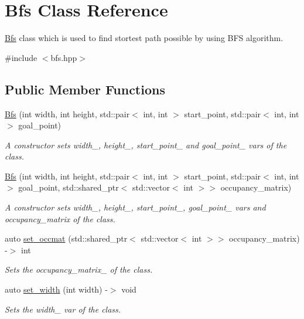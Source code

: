 \hypertarget{class_bfs}{}\section{Bfs Class Reference}
\label{class_bfs}


\hyperlink{class_bfs}{Bfs} class which is used to find stortest path possible by using B\+FS algorithm.  




{\ttfamily \#include $<$bfs.\+hpp$>$}

\subsection*{Public Member Functions}
\begin{DoxyCompactItemize}
\item 
\hyperlink{class_bfs_a25bb98dd5a3e3ceab6940adad7e7d758}{Bfs} (int width, int height, std\+::pair$<$ int, int $>$ start\+\_\+point, std\+::pair$<$ int, int $>$ goal\+\_\+point)
\begin{DoxyCompactList}\small\item\em A constructor sets width\+\_\+, height\+\_\+, start\+\_\+point\+\_\+ and goal\+\_\+point\+\_\+ vars of the class. \end{DoxyCompactList}\item 
\hyperlink{class_bfs_a9ccaf8189ccb3f590c8ebca2d814c775}{Bfs} (int width, int height, std\+::pair$<$ int, int $>$ start\+\_\+point, std\+::pair$<$ int, int $>$ goal\+\_\+point, std\+::shared\+\_\+ptr$<$ std\+::vector$<$ int $>$$>$ occupancy\+\_\+matrix)
\begin{DoxyCompactList}\small\item\em A constructor sets width\+\_\+, height\+\_\+, start\+\_\+point\+\_\+, goal\+\_\+point\+\_\+ vars and occupancy\+\_\+matrix of the class. \end{DoxyCompactList}\item 
auto \hyperlink{class_bfs_a731c6ba80fdc5aa90d9c41e2829049a7}{set\+\_\+occmat} (std\+::shared\+\_\+ptr$<$ std\+::vector$<$ int $>$$>$ occupancy\+\_\+matrix) -\/$>$ int
\begin{DoxyCompactList}\small\item\em Sets the occupancy\+\_\+matrix\+\_\+ of the class. \end{DoxyCompactList}\item 
auto \hyperlink{class_bfs_a4c6fde0f40891f828481bb460dbca874}{set\+\_\+width} (int width) -\/$>$ void
\begin{DoxyCompactList}\small\item\em Sets the width\+\_\+ var of the class. \end{DoxyCompactList}\item 

\end{DoxyCompactItemize}
